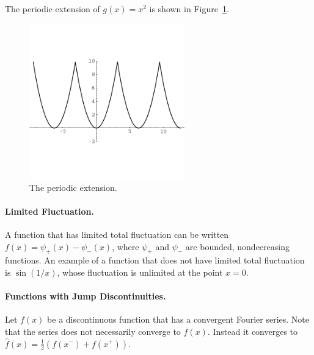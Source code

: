 The periodic extension of $g(x) = x^2$ is shown in Figure~\ref{per_ext_xs}.

\begin{figure}[h!]
  \begin{center}
    \includegraphics[width=0.6\textwidth]{ode/fourier_series/per_ext}
  \end{center}
  \caption{The periodic extension.}
  \label{per_ext_xs}
\end{figure}


\paragraph{Limited Fluctuation.}
A function that has limited total fluctuation can be written $f(x) = \psi_+(x) - \psi_-(x)$,
where $\psi_+$ and $\psi_-$ are bounded, nondecreasing functions.
An example of a function that does not have limited total fluctuation
is $\sin(1/x)$, whose fluctuation is unlimited at the point $x=0$.

\paragraph{Functions with Jump Discontinuities.}
Let $f(x)$ be a discontinuous function that has a convergent Fourier 
series.  Note that the series does not necessarily converge to $f(x)$.
Instead it converges to $\hat{f}(x) = \frac{1}{2}(f(x^-)+f(x^+))$.



